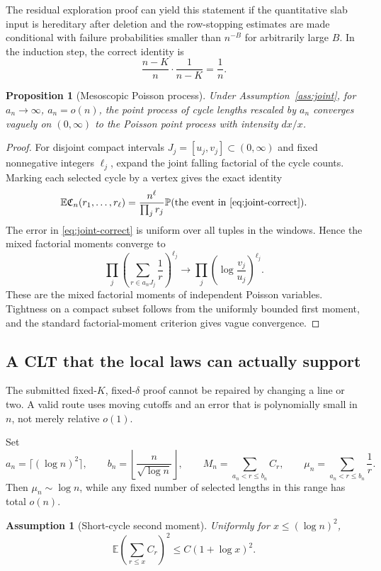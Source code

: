 \documentclass[11pt]{article}
\newcommand{\E}{\mathbb E}
\newcommand{\Pp}{\mathbb P}
\newcommand{\1}{\mathbf 1}
\newtheorem{proposition}[theorem]{Proposition}
\newtheorem{assumption}[theorem]{Assumption}
\theoremstyle{remark}
\begin{document}
The residual exploration proof can yield this statement if the quantitative
slab input is hereditary after deletion and the row-stopping estimates are
made conditional with failure probabilities smaller than $n^{-B}$ for
arbitrarily large $B$.  In the induction step, the correct identity is
\[
 \frac{n-K}{n}\cdot\frac1{n-K}=\frac1n.
\]

\begin{proposition}[Mesoscopic Poisson process]\label{prop:ppp-correct}
Under Assumption~\ref{ass:joint}, for $a_n\to\infty$, $a_n=o(n)$, the point
process of cycle lengths rescaled by $a_n$ converges vaguely on
$(0,\infty)$ to the Poisson point process with intensity $dx/x$.
\end{proposition}

\begin{proof}
For disjoint compact intervals $J_j=[u_j,v_j]\subset(0,\infty)$ and fixed
nonnegative integers $\ell_j$, expand the joint falling factorial of the cycle
counts.  Marking each selected cycle by a vertex gives the exact identity
\[
 \E\mathfrak C_n(r_1,\dots,r_\ell)
 =\frac{n^\ell}{\prod_jr_j}
 \Pp(\text{the event in \eqref{eq:joint-correct}}).
\]
The error in \eqref{eq:joint-correct} is uniform over all tuples in the
windows.  Hence the mixed factorial moments converge to
\[
 \prod_j\left(\sum_{r\in a_nJ_j}\frac1r\right)^{\ell_j}
 \longrightarrow
 \prod_j\left(\log\frac{v_j}{u_j}\right)^{\ell_j}.
\]
These are the mixed factorial moments of independent Poisson variables.
Tightness on a compact subset follows from the uniformly bounded first moment,
and the standard factorial-moment criterion gives vague convergence.
\end{proof}

\subsection{A CLT that the local laws can actually support}

The submitted fixed-$K$, fixed-$\delta$ proof cannot be repaired by changing a
line or two.  A valid route uses moving cutoffs and an error that is
polynomially small in $n$, not merely relative $o(1)$.

Set
\[
 a_n=\lceil(\log n)^2\rceil,
 \qquad b_n=\left\lfloor\frac{n}{\sqrt{\log n}}\right\rfloor,
 \qquad
 M_n=\sum_{a_n<r\le b_n}C_r,
 \qquad
 \mu_n=\sum_{a_n<r\le b_n}\frac1r.
\]
Then $\mu_n\sim\log n$, while any fixed number of selected lengths in this
range has total $o(n)$.

\begin{assumption}[Short-cycle second moment]\label{ass:short2}
Uniformly for $x\le(\log n)^2$,
\begin{equation}\label{eq:short2}
 \E\left(\sum_{r\le x}C_r\right)^2\le C(1+\log x)^2.
\end{equation}
\end{assumption}
\end{document}
